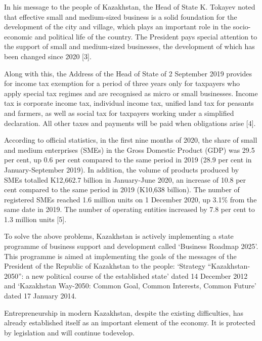 \begin{multicols}{2}
In his message to the people of Kazakhstan, the Head of State K. Tokayev
noted that effective small and medium-sized business is a solid
foundation for the development of the city and village, which plays an
important role in the socio-economic and political life of the country.
The President pays special attention to the support of small and
medium-sized businesses, the development of which has been changed since
2020 {[}3{]}.

Along with this, the Address of the Head of State of 2 September 2019
provides for income tax exemption for a period of three years only for
taxpayers who apply special tax regimes and are recognised as micro or
small businesses. Income tax is corporate income tax, individual income
tax, unified land tax for peasants and farmers, as well as social tax
for taxpayers working under a simplified declaration. All other taxes
and payments will be paid when obligations arise {[}4{]}.

According to official statistics, in the first nine months of 2020, the
share of small and medium enterprises (SMEs) in the Gross Domestic
Product (GDP) was 29.5 per cent, up 0.6 per cent compared to the same
period in 2019 (28.9 per cent in January-September 2019). In addition,
the volume of products produced by SMEs totalled K12,662.7 billion in
January-June 2020, an increase of 10.8 per cent compared to the same
period in 2019 (K10,638 billion). The number of registered SMEs reached
1.6 million units on 1 December 2020, up 3.1\% from the same date in
2019. The number of operating entities increased by 7.8 per cent to 1.3
million units {[}5{]}.

To solve the above problems, Kazakhstan is actively implementing a state
programme of business support and development called `Business Roadmap
2025'. This programme is aimed at implementing the goals of the messages
of the President of the Republic of Kazakhstan to the people: `Strategy
``Kazakhstan-2050'': a new political course of the established state'
dated 14 December 2012 and `Kazakhstan Way-2050: Common Goal, Common
Interests, Common Future' dated 17 January 2014.

Entrepreneurship in modern Kazakhstan, despite the existing
difficulties, has already established itself as an important element of
the economy. It is protected by legislation and will continue todevelop.
\end{multicols}

